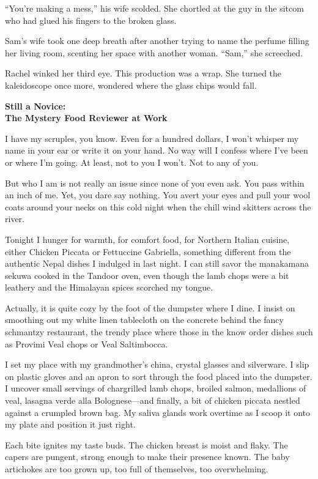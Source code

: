 \documentclass[
]{article}
\begin{document}
``You're making a mess,'' his wife scolded. She chortled at the guy in
the sitcom who had glued his fingers to the broken glass.

Sam's wife took one deep breath after another trying to name the perfume
filling her living room, scenting her space with another woman. ``Sam,''
she screeched.

Rachel winked her third eye. This production was a wrap. She turned the
kaleidoscope once more, wondered where the glass chips would fall.

\textbf{\hfill\break
}

\textbf{Still a Novice:\\
The Mystery Food Reviewer at Work}

I have my scruples, you know. Even for a hundred dollars, I won't
whisper my name in your ear or write it on your hand. No way will I
confess where I've been or where I'm going. At least, not to you I
won't. Not to any of you.

But who I am is not really an issue since none of you even ask. You pass
within an inch of me. Yet, you dare say nothing. You avert your eyes and
pull your wool coats around your necks on this cold night when the chill
wind skitters across the river.

Tonight I hunger for warmth, for comfort food, for Northern Italian
cuisine, either Chicken Piccata or Fettuccine Gabriella, something
different from the authentic Nepal dishes I indulged in last night. I
can still savor the manakamana sekuwa cooked in the Tandoor oven, even
though the lamb chops were a bit leathery and the Himalayan spices
scorched my tongue.

Actually, it is quite cozy by the foot of the dumpster where I dine. I
insist on smoothing out my white linen tablecloth on the concrete behind
the fancy schmantzy restaurant, the trendy place where those in the know
order dishes such as Provimi Veal chops or Veal Saltimbocca.

I set my place with my grandmother's china, crystal glasses and
silverware. I slip on plastic gloves and an apron to sort through the
food placed into the dumpster. I uncover small servings of chargrilled
lamb chops, broiled salmon, medallions of veal, lasagna verde alla
Bolognese---and finally, a bit of chicken piccata nestled against a
crumpled brown bag. My saliva glands work overtime as I scoop it onto my
plate and position it just right.

Each bite ignites my taste buds. The chicken breast is moist and flaky.
The capers are pungent, strong enough to make their presence known. The
baby artichokes are too grown up, too full of them­selves, too
overwhelming.
\end{document}
